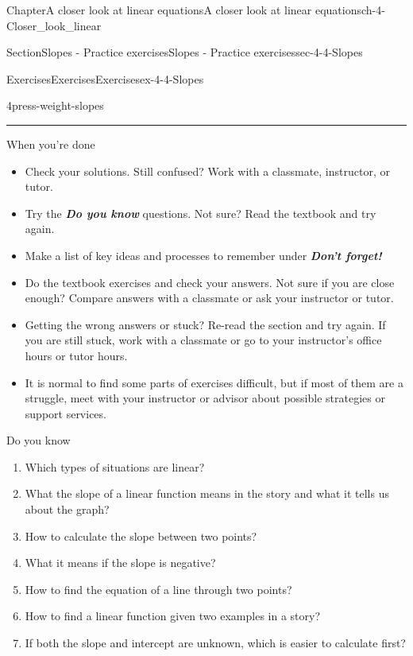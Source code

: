 \documentclass[twoside,11pt,]{book}
\newcommand{\alert}[1]{\textbf{\textit{#1}}}
\newlength{\workspacestrutwidth}
\numberwithin{equation}{section}
\begin{document}
\begin{chapterptx}{Chapter}{A closer look at linear equations}{}{A closer look at linear equations}{}{}{ch-4-Closer_look_linear}
\begin{sectionptx}{Section}{Slopes - Practice exercises}{}{Slopes - Practice exercises}{}{}{sec-4-4-Slopes}
\begin{exercises-subsection-numberless}{Exercises}{Exercises}{}{Exercises}{}{}{ex-4-4-Slopes}
\begin{divisionexercise}{4}{}{}{press-weight-slopes}
\begin{enumerate}[label=(\alph*),ref=\alph*]
\par\rule{\workspacestrutwidth}{1.25in}%
\end{enumerate}%
\end{divisionexercise}%
\end{exercises-subsection-numberless}
\begin{conclusion}{When you're done \textellipsis{}}%
%
\begin{itemize}[label=\textbullet]
\item{}Check your solutions. Still confused? Work with a classmate, instructor, or tutor.%
\item{}Try the \alert{Do you know} questions. Not sure? Read the textbook and try again.%
\item{}Make a list of key ideas and processes to remember under \alert{Don't forget!}%
\item{}Do the textbook exercises and check your answers. Not sure if you are close enough? Compare answers with a classmate or ask your instructor or tutor.%
\item{}Getting the wrong answers or stuck? Re-read the section and try again. If you are still stuck, work with a classmate or go to your instructor's office hours or tutor hours.%
\item{}It is normal to find some parts of exercises difficult, but if most of them are a struggle, meet with your instructor or advisor about possible strategies or support services.%
\end{itemize}
%
\end{conclusion}%
\begin{conclusion}{Do you know \textellipsis{}}%
%
\begin{enumerate}[label={\Alph*.}]
\item{}Which types of situations are linear?%
\item{}What the slope of a linear function means in the story and what it tells us about the graph?%
\item{}How to calculate the slope between two points?%
\item{}What it means if the slope is negative?%
\item{}How to find the equation of a line through two points?%
\item{}How to find a linear function given two examples in a story?%
\item{}If both the slope and intercept are unknown, which is easier to calculate first?%
\end{enumerate}
%
\par

\end{conclusion}
\end{sectionptx}
\end{chapterptx}
\end{document}
